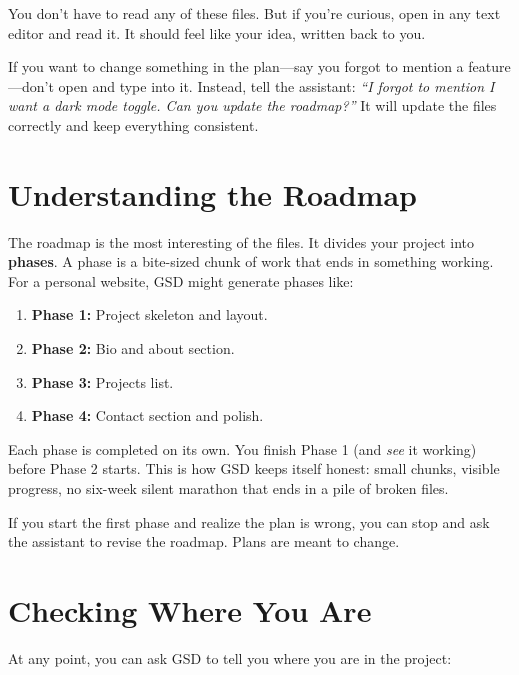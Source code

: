 \documentclass[11pt,letterpaper,openany]{book}
\begin{document}
You don't have to read any of these files. But if you're curious, open
 in any text editor and read it. It should feel like
your idea, written back to you.

\begin{gsdimportant}
If you want to change something in the plan---say you forgot to mention
a feature---don't open  and type into it. Instead,
tell the assistant: \emph{``I forgot to mention I want a dark mode
toggle. Can you update the roadmap?''} It will update the files
correctly and keep everything consistent.
\end{gsdimportant}

\section{Understanding the Roadmap}

The roadmap is the most interesting of the files. It divides your
project into \textbf{phases}. A phase is a bite-sized chunk of work that
ends in something working. For a personal website, GSD might generate
phases like:

\begin{enumerate}
  \item \textbf{Phase 1:} Project skeleton and layout.
  \item \textbf{Phase 2:} Bio and about section.
  \item \textbf{Phase 3:} Projects list.
  \item \textbf{Phase 4:} Contact section and polish.
\end{enumerate}

Each phase is completed on its own. You finish Phase 1 (and \emph{see}
it working) before Phase 2 starts. This is how GSD keeps itself honest:
small chunks, visible progress, no six-week silent marathon that ends
in a pile of broken files.

\begin{gsdnote}
If you start the first phase and realize the plan is wrong, you can
stop and ask the assistant to revise the roadmap. Plans are meant to
change.
\end{gsdnote}

\section{Checking Where You Are}

At any point, you can ask GSD to tell you where you are in the project:
\end{document}
